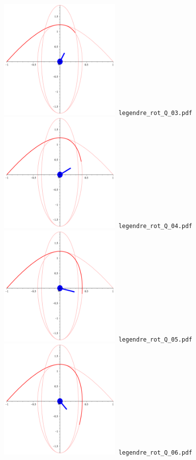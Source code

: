 \documentclass[a4paper]{amsart}
\begin{document}
\includegraphics[width=6cm]{legendre_rot_Q_03.pdf}\verb+ legendre_rot_Q_03.pdf+\\
\includegraphics[width=6cm]{legendre_rot_Q_04.pdf}\verb+ legendre_rot_Q_04.pdf+\\
\includegraphics[width=6cm]{legendre_rot_Q_05.pdf}\verb+ legendre_rot_Q_05.pdf+\\
\includegraphics[width=6cm]{legendre_rot_Q_06.pdf}\verb+ legendre_rot_Q_06.pdf+\\
\end{document}
